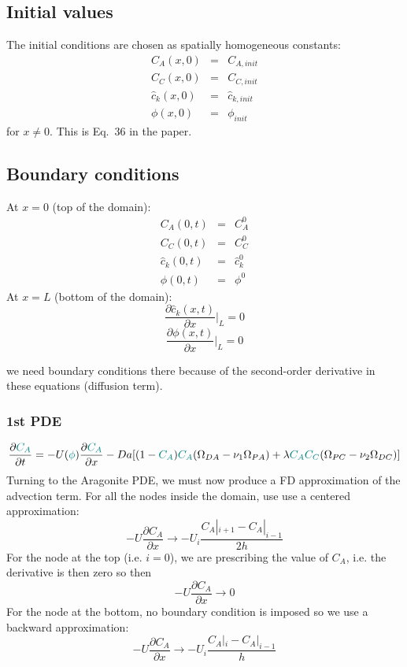 \documentclass[a4paper]{article}
\begin{document}
\subsection*{Initial values}

The initial conditions are chosen as spatially homogeneous constants:
\begin{eqnarray}
C_A(x,0)&=&C_{A,init} \\
C_C(x,0)&=&C_{C,init} \\
\hat{c}_k(x,0)&=&\hat{c}_{k,init} \\
\phi(x,0) &=& \phi_{init}
\end{eqnarray}
for $x\ne 0$. This is Eq.~36 in the paper.

\subsection*{Boundary conditions}

At $x=0$ (top of the domain):
\begin{eqnarray}
C_A(0,t)&=&C_{A}^0 \\
C_C(0,t)&=&C_{C}^0 \\
\hat{c}_k(0,t)&=&\hat{c}_{k}^0 \\
\phi(0,t) &=& \phi^0
\end{eqnarray}
At $x=L$ (bottom of the domain):
\[
\frac{\partial \hat{c}_k (x,t)}{\partial x}|_L = 0
\]
\[
\frac{\partial \phi (x,t)}{\partial x}|_L = 0
\]

we need boundary conditions there because of the second-order 
derivative in these equations (diffusion term).


\subsubsection*{1st PDE}

\[
\frac{\partial {\color{teal} C_A}}{\partial t} 
= -U({\color{teal}\phi}) \frac{\partial {\color{teal}C_A}}{\partial x} 
- Da[(1-{\color{teal}C_A}){\color{teal}C_A}(\Omega_{DA}-\nu_1\Omega_{PA})+
\lambda {\color{teal}C_AC_C} (\Omega_{PC}-\nu_2\Omega_{DC})]
\]
Turning to the Aragonite PDE, we must now produce a FD approximation of the advection term.
For all the nodes inside the domain, use use a centered approximation:
\[
-U \frac{\partial C_A}{\partial x} \rightarrow -U_i \frac{C_A|_{i+1} -C_A|_{i-1}}{2h}
\]
For the node at the top (i.e. $i=0$), we are prescribing the value of $C_A$, i.e.
the derivative is then zero so then 
\[
-U \frac{\partial C_A}{\partial x} \rightarrow 0 
\]
For the node at the bottom, no boundary condition is imposed so we use a backward
approximation:
\[
-U \frac{\partial C_A}{\partial x} \rightarrow -U_i \frac{C_A|_{i} -C_A|_{i-1}}{h}
\]
 
\end{document}
